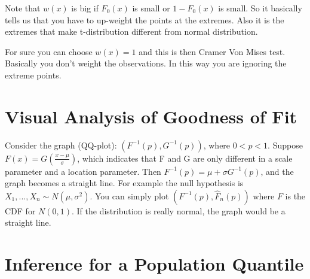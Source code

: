 \documentclass[twoside]{article}
\begin{document}
Note that $w(x)$ is big if $F_0(x)$ is small or $1 - F_0(x)$ is small. So it basically tells us that you have to up-weight the points at the extremes. Also it is the extremes that make t-distribution different from normal distribution. 

For sure you can choose $w(x) = 1$ and this is then Cramer Von Mises test. Basically you don't weight the observations. In this way you are ignoring the extreme points. 

\section{Visual Analysis of Goodness of Fit}
Consider the graph (QQ-plot): $\left( F^{-1} (p), G^{-1} (p) \right)$, where $0 < p < 1$. Suppose $F \left( x \right) = G\left( \frac{x - \mu}{\sigma} \right)$, which indicates that F and G are only different in a scale parameter and a location parameter. Then $F^{-1} (p) = \mu + \sigma G^{-1} (p)$, and the graph becomes a straight line. For example the null hypothesis is $X_1, ..., X_n \sim N(\mu, \sigma^2)$. You can simply plot $\left( F^{-1} (p), \hat{F}_n (p) \right)$ where $F$ is the CDF for $N(0,1)$. If the distribution is really normal, the graph would be a straight line. 

\section{Inference for a Population Quantile}
\end{document}
